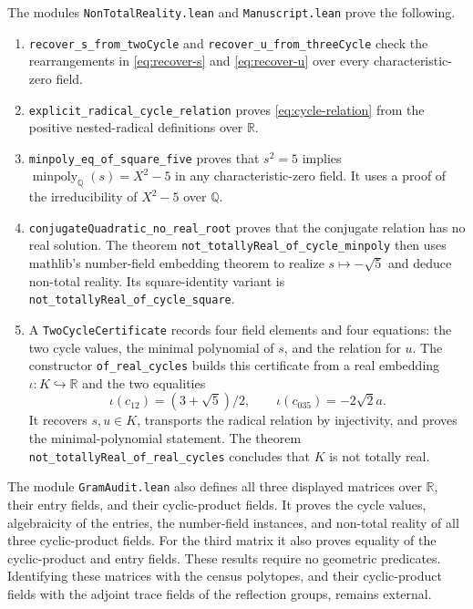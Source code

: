 \documentclass[11pt]{article}
\numberwithin{equation}{section}
\theoremstyle{definition}
\theoremstyle{remark}
\newcommand{\Q}{\mathbb{Q}}
\newcommand{\R}{\mathbb{R}}
\newcommand{\minpoly}{\operatorname{minpoly}}
\newcommand{\code}[1]{\texttt{#1}}
\begin{document}
The modules \code{NonTotalReality.lean} and \code{Manuscript.lean}
prove the following.

\begin{enumerate}[leftmargin=2.2em]
\item \code{recover\_s\_from\_twoCycle} and
  \code{recover\_u\_from\_threeCycle} check the rearrangements in
  \eqref{eq:recover-s} and \eqref{eq:recover-u} over every
  characteristic-zero field.
\item \code{explicit\_radical\_cycle\_relation} proves
  \eqref{eq:cycle-relation} from the positive nested-radical definitions
  over \(\R\).
\item \code{minpoly\_eq\_of\_square\_five} proves that \(s^2=5\) implies
  \(\minpoly_\Q(s)=X^2-5\) in any characteristic-zero field.  It uses a
  proof of the irreducibility of \(X^2-5\) over \(\Q\).
\item \code{conjugateQuadratic\_no\_real\_root} proves that the conjugate
  relation has no real solution.  The theorem
  \code{not\_totallyReal\_of\_cycle\_minpoly} then uses mathlib's
  number-field embedding theorem to realize \(s\mapsto-\sqrt5\) and
  deduce non-total reality.  Its square-identity variant is
  \code{not\_totallyReal\_of\_cycle\_square}.
\item A \code{TwoCycleCertificate} records four field elements and four
  equations: the two cycle values, the minimal polynomial of \(s\), and
  the relation for \(u\).  The constructor \code{of\_real\_cycles}
  builds this certificate from a real embedding \(\iota:K\hookrightarrow\R\)
  and the two equalities
  \[
   \iota(c_{12})=(3+\sqrt5)/2,\qquad
   \iota(c_{035})=-2\sqrt2a.
  \]
  It recovers \(s,u\in K\), transports the radical relation by injectivity,
  and proves the minimal-polynomial statement.  The theorem
  \code{not\_totallyReal\_of\_real\_cycles} concludes that \(K\) is not
  totally real.
\end{enumerate}

The module \code{GramAudit.lean} also defines all three displayed matrices
over \(\R\), their entry fields, and their cyclic-product fields.  It proves
the cycle values, algebraicity of the entries, the number-field instances,
and non-total reality of all three cyclic-product fields.  For the third
matrix it also proves equality of the cyclic-product and entry fields.
These results require no geometric predicates.  Identifying these matrices
with the census polytopes, and their cyclic-product fields with the adjoint
trace fields of the reflection groups, remains external.
\end{document}
